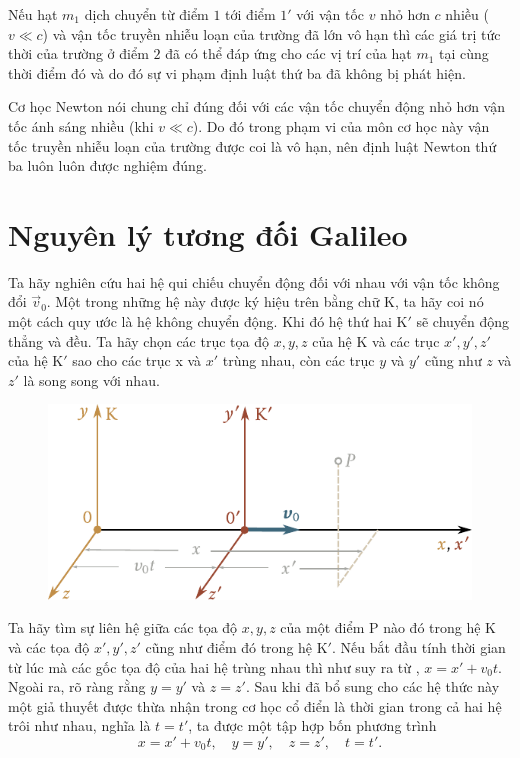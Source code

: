 Nếu hạt $m_1$ dịch chuyển từ điểm $1$ tới điểm $1'$ với vận tốc $v$ nhỏ hơn $c$ nhiều ($v\ll c$) và vận tốc truyền nhiễu loạn của trường đã lớn vô hạn thì các giá trị tức thời của trường ở điểm $2$ đã có thể đáp ứng cho các vị trí của hạt $m_1$ tại cùng thời điểm đó và do đó sự vi phạm định luật thứ ba đã không bị phát hiện.

Cơ học Newton nói chung chỉ đúng đối với các vận tốc chuyển động nhỏ hơn vận tốc ánh sáng nhiều (khi $v\ll c$). Do đó trong phạm vi của môn cơ học này vận tốc truyền nhiễu loạn của trường được coi là vô hạn, nên định luật Newton thứ ba luôn luôn được nghiệm đúng.

\section{Nguyên lý tương đối Galileo}\label{sec:2_7}

Ta hãy nghiên cứu hai hệ qui chiếu chuyển động đối với nhau với vận tốc không đổi $\vec{v}_0$. Một trong những hệ này được ký hiệu trên  bằng chữ K, ta hãy coi nó một cách quy ước là hệ không chuyển động. Khi đó hệ thứ hai K$'$ sẽ chuyển động thẳng và đều. Ta hãy chọn các trục tọa độ $x, y, z$ của hệ K và các trục $x',y',z'$ của hệ K$'$ sao cho các trục x và $x'$ trùng nhau, còn các trục $y$ và $y'$ cũng như $z$ và $z'$ là song song với nhau.

\begin{figure}[!htb]
	\begin{center}
		\includegraphics[scale=1]{figures/ch_02/fig_2_3.pdf}
		\caption[]{}
		\label{fig:2_3}
	\end{center}
\end{figure}

Ta hãy tìm sự liên hệ giữa các tọa độ $x, y, z$ của một điểm P nào đó trong hệ K và các tọa độ $x', y', z'$ cũng như điểm đó trong hệ K$'$. Nếu bắt đầu tính thời gian từ lúc mà các gốc tọa độ của hai hệ trùng nhau thì như suy ra từ , $x=x'+v_0t$. Ngoài ra, rõ ràng rằng $y=y'$ và $z=z'$. Sau khi đã bổ sung cho các hệ thức này một giả thuyết được thừa nhận trong cơ học cổ điển là thời gian trong cả hai hệ trôi như nhau, nghĩa là $t=t'$, ta được một tập hợp bốn phương trình
\begin{equation}\label{eq:2_19}
x=x'+v_0t,\quad y=y',\quad z=z',\quad t=t'.
\end{equation}

